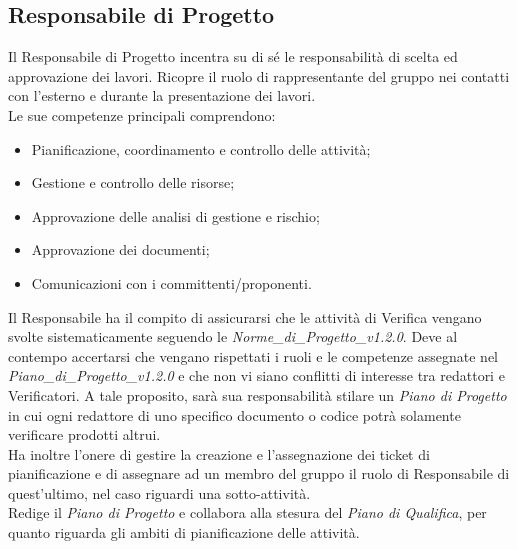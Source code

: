 \subsection{Responsabile di Progetto} %
\label{2.1}
Il Responsabile di Progetto incentra su di sé le responsabilità di scelta ed approvazione dei lavori. Ricopre il ruolo di rappresentante del gruppo nei contatti con l'esterno e durante la presentazione dei lavori.\\
Le sue competenze principali comprendono:
\begin{itemize}
\item Pianificazione, coordinamento e controllo delle attività;
\item Gestione e controllo delle risorse;
\item Approvazione delle analisi di gestione e rischio;
\item Approvazione dei documenti;
\item Comunicazioni con i committenti/proponenti.
\end{itemize}
Il Responsabile ha il compito di assicurarsi che le attività di Verifica vengano svolte sistematicamente seguendo le \emph{Norme\_di\_Progetto\_v1.2.0}. Deve al contempo accertarsi che vengano rispettati i ruoli e le competenze assegnate nel \emph{Piano\_di\_Progetto\_v1.2.0} e che non vi siano conflitti di interesse tra redattori e Verificatori. A tale proposito, sarà sua responsabilità stilare un \emph{Piano di Progetto} in cui ogni redattore di uno specifico documento o codice potrà solamente verificare prodotti altrui.\\
Ha inoltre l'onere di gestire la creazione e l'assegnazione dei ticket di pianificazione e di assegnare ad un membro del gruppo il ruolo di Responsabile di quest'ultimo, nel caso riguardi una sotto-attività.\\
Redige il \emph{Piano di Progetto} e collabora alla stesura del \emph{Piano di Qualifica}, per quanto riguarda gli ambiti di pianificazione delle attività.


